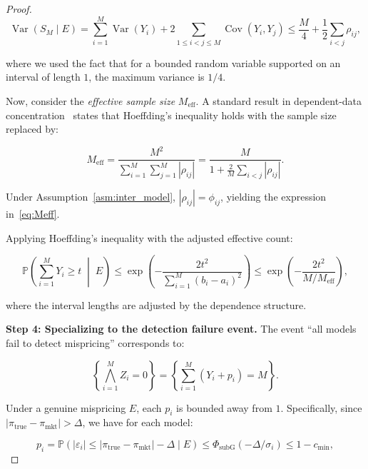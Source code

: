 \documentclass[11pt,a4paper]{article}
\theoremstyle{plain}
\theoremstyle{definition}
\theoremstyle{remark}
\newcommand{\Pbb}{\mathbb{P}}
\newcommand{\Var}{\operatorname{Var}}
\newcommand{\Cov}{\operatorname{Cov}}
\begin{document}
\begin{proof}
\begin{equation}\label{eq:var_sum}
  \Var(S_M \mid E) = \sum_{i=1}^M \Var(Y_i) + 2\sum_{1 \leq i < j \leq M} \Cov(Y_i, Y_j) \leq \frac{M}{4} + \frac{1}{2}\sum_{i<j} \rho_{ij},
\end{equation}

where we used the fact that for a bounded random variable supported on an interval of length $1$, the maximum variance is $1/4$.

Now, consider the \emph{effective sample size} $M_{\text{eff}}$. A standard result in dependent-data concentration~\citep{bentkus2005hoeffding} states that Hoeffding's inequality holds with the sample size replaced by:

\begin{equation}\label{eq:Meff_variance}
  M_{\text{eff}} = \frac{M^2}{\sum_{i=1}^M \sum_{j=1}^M |\rho_{ij}|} = \frac{M}{1 + \frac{2}{M}\sum_{i<j} |\rho_{ij}|}.
\end{equation}

Under Assumption~\ref{asm:inter_model}, $|\rho_{ij}| = \phi_{ij}$, yielding the expression in~\eqref{eq:Meff}.

Applying Hoeffding's inequality with the adjusted effective count:

\begin{equation}\label{eq:hoeffding_applied}
  \Pbb\!\left(\sum_{i=1}^M Y_i \geq t \;\middle|\; E\right) \leq \exp\!\left(-\frac{2t^2}{\sum_{i=1}^M (b_i - a_i)^2}\right) \leq \exp\!\left(-\frac{2t^2}{M / M_{\text{eff}}}\right),
\end{equation}

where the interval lengths are adjusted by the dependence structure.

\medskip\noindent\textbf{Step 4: Specializing to the detection failure event.}
The event ``all models fail to detect mispricing'' corresponds to:

\begin{equation}\label{eq:event}
  \left\{\bigwedge_{i=1}^M Z_i = 0\right\} = \left\{\sum_{i=1}^M (Y_i + p_i) = M\right\}.
\end{equation}

Under a genuine mispricing $E$, each $p_i$ is bounded away from $1$. Specifically, since $|\pi_{\text{true}} - \pi_{\text{mkt}}| > \Delta$, we have for each model:

\begin{equation}\label{eq:pi_bound}
  p_i = \Pbb(|\varepsilon_i| \leq |\pi_{\text{true}} - \pi_{\text{mkt}}| - \Delta \mid E) \leq \Phi_{\text{subG}}(-\Delta / \sigma_i) \leq 1 - c_{\min},
\end{equation}


\end{proof}
\end{document}
